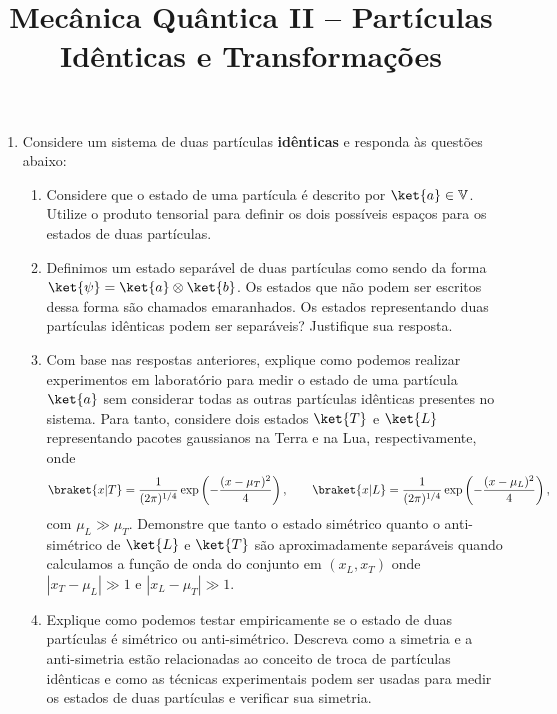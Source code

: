 \newif\ifuseseminar
\useseminartrue


\title{Mecânica Quântica II -- Partículas Idênticas e Transformações}


\begin{enumerate}
	\item Considere um sistema de duas partículas {\bf idênticas} e responda às questões
	      abaixo:
	      \begin{enumerate}
		      \item Considere que o estado de uma partícula é descrito por $\ket{a} \in
			            \mathbb{V}$. Utilize o produto tensorial para definir os dois possíveis
		            espaços para os estados de duas partículas.
		      \item Definimos um estado separável de duas partículas como sendo da forma
		            $\ket{\psi} = \ket{a}\otimes\ket{b}$. Os estados que não podem ser
		            escritos dessa forma são chamados emaranhados. Os estados representando
		            duas partículas idênticas podem ser separáveis? Justifique sua resposta.
		      \item Com base nas respostas anteriores, explique como podemos realizar
		            experimentos em laboratório para medir o estado de uma partícula
		            $\ket{a}$ sem considerar todas as outras partículas idênticas presentes no
		            sistema. Para tanto, considere dois estados $\ket{T}$ e $\ket{L}$
		            representando pacotes gaussianos na Terra e na Lua, respectivamente, onde
		            $$\braket{x|T} =
			            \frac{1}{(2\pi)^{1/4}}\exp\left(-\frac{(x-\mu_T)^2}{4}\right),
			            \qquad \braket{x|L} =
			            \frac{1}{(2\pi)^{1/4}}\exp\left(-\frac{(x-\mu_L)^2}{4}\right),$$ com
		            $\mu_L\gg\mu_T$. Demonstre que tanto o estado simétrico quanto o
		            anti-simétrico de $\ket{L}$ e $\ket{T}$ são aproximadamente
		            separáveis quando calculamos a função de onda do conjunto em $(x_L,
			            x_T)$ onde $|x_T-\mu_L|\gg1$ e $|x_L-\mu_T|\gg1$.
		      \item Explique como podemos testar empiricamente se o estado de duas
		            partículas é simétrico ou anti-simétrico. Descreva como a simetria e a
		            anti-simetria estão relacionadas ao conceito de troca de partículas
		            idênticas e como as técnicas experimentais podem ser usadas para medir os
		            estados de duas partículas e verificar sua simetria.
	      \end{enumerate}

\end{enumerate}
